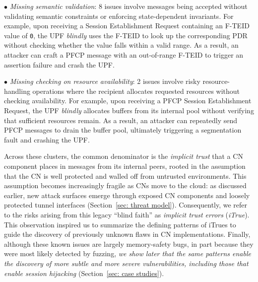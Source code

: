 \vspace{2pt}\noindent$\bullet$ \textit{Missing semantic validation}: 8 issues involve messages being accepted without validating semantic constraints or enforcing state-dependent invariants. For example, upon receiving a Session Establishment Request containing an F-TEID value of \texttt{0}, the UPF \textit{blindly} uses the F-TEID to look up the corresponding PDR without checking whether the value falls within a valid range. As a result, an attacker can craft a PFCP message with an out-of-range F-TEID to trigger an assertion failure and crash the UPF.

\vspace{2pt}\noindent$\bullet$ \textit{Missing checking on resource availability}: 2 issues involve risky resource-handling operations where the recipient allocates requested resources without checking availability. For example, upon receiving a PFCP Session Establishment Request, the UPF \textit{blindly} allocates buffers from its internal pool without verifying that sufficient resources remain. As a result, an attacker can repeatedly send PFCP messages to drain the buffer pool, ultimately triggering a segmentation fault and crashing the UPF.

Across these clusters, the common denominator is the \textit{implicit trust} that a CN component places in messages from its internal peers, rooted in the assumption that the CN is well protected and walled off from untrusted environments. This assumption becomes increasingly fragile as CNs move to the cloud: as discussed earlier, new attack surfaces emerge through exposed CN components and loosely protected tunnel interfaces (Section~\ref{sec: threat model}). 
Consequently, we refer to the risks arising from this legacy ``blind faith'' as \textit{implicit trust errors} (\textit{iTrue}).
This observation inspired us to summarize the defining patterns of iTrues to guide the discovery of previously unknown flaws in CN implementations. Finally, although these known issues are largely memory-safety bugs, in part because they were most likely detected by fuzzing, \textit{we show later that the same patterns enable the discovery of more subtle and more severe vulnerabilities, including those that enable session hijacking} (Section~\ref{sec: case studies}).



